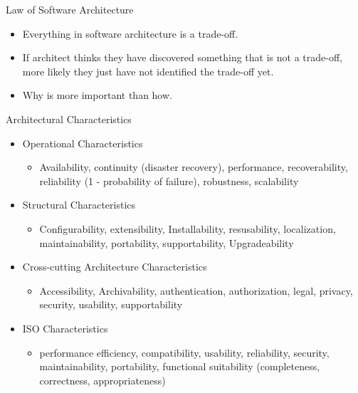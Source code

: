 \documentclass{beamer}
\begin{document}
\begin{frame}{Law of Software Architecture}
\begin{itemize}
\item Everything in software architecture is a trade-off.
\item If architect thinks they have discovered something that is not a trade-off, more likely they just have not identified the trade-off yet.
\item Why is more important than how.
\end{itemize}
\end{frame}

\begin{frame}{Architectural Characteristics}
\begin{itemize}
\item Operational Characteristics
\begin{itemize}
\item Availability, continuity (disaster recovery), performance, recoverability, 
	reliability (1 - probability of failure), robustness, scalability
\end{itemize}
\item Structural Characteristics
\begin{itemize}
\item Configurability, extensibility, Installability, resusability, localization, maintainability, portability, supportability, Upgradeability
\end{itemize}
\item Cross-cutting Architecture Characteristics
\begin{itemize}
\item Accessibility, Archivability, authentication, authorization, legal, privacy, security,
usability, supportability
\end{itemize}
\item ISO Characteristics
\begin{itemize}
\item performance efficiency, compatibility, usability, reliability, security, maintainability, portability, functional suitability (completeness, correctness, appropriateness)
\end{itemize}
\end{itemize}
\end{frame}
\end{document}
